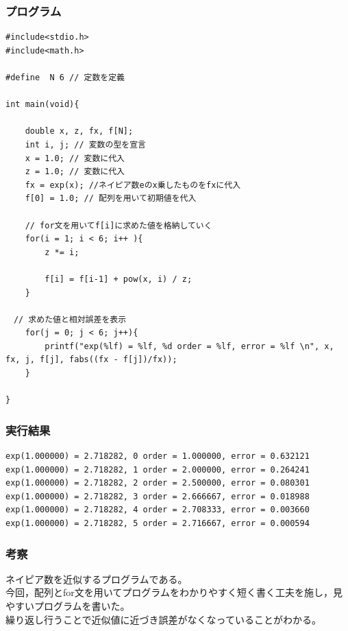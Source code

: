 \documentclass{jarticle}
\begin{document}
\subsubsection{プログラム\\}
\begin{breakbox}
\begin{verbatim}
#include<stdio.h>
#include<math.h>

#define  N 6 // 定数を定義

int main(void){

    double x, z, fx, f[N];
    int i, j; // 変数の型を宣言
    x = 1.0; // 変数に代入
    z = 1.0; // 変数に代入
    fx = exp(x); //ネイピア数eのx乗したものをfxに代入
    f[0] = 1.0; // 配列を用いて初期値を代入
    
    // for文を用いてf[i]に求めた値を格納していく
    for(i = 1; i < 6; i++ ){
        z *= i;

        f[i] = f[i-1] + pow(x, i) / z;
    }
    
　// 求めた値と相対誤差を表示
    for(j = 0; j < 6; j++){
        printf("exp(%lf) = %lf, %d order = %lf, error = %lf \n", x, fx, j, f[j], fabs((fx - f[j])/fx));
    }

}
\end{verbatim}
\end{breakbox}

\subsubsection{実行結果\\}
\begin{breakbox}
\begin{verbatim}
exp(1.000000) = 2.718282, 0 order = 1.000000, error = 0.632121 
exp(1.000000) = 2.718282, 1 order = 2.000000, error = 0.264241 
exp(1.000000) = 2.718282, 2 order = 2.500000, error = 0.080301 
exp(1.000000) = 2.718282, 3 order = 2.666667, error = 0.018988 
exp(1.000000) = 2.718282, 4 order = 2.708333, error = 0.003660 
exp(1.000000) = 2.718282, 5 order = 2.716667, error = 0.000594 
\end{verbatim}
\end{breakbox}
\subsubsection{考察\\}
ネイピア数を近似するプログラムである。\\
今回，配列とfor文を用いてプログラムをわかりやすく短く書く工夫を施し，見やすいプログラムを書いた。\\
繰り返し行うことで近似値に近づき誤差がなくなっていることがわかる。\\
\end{document}
